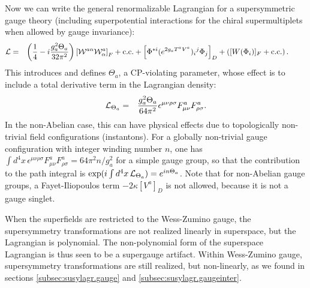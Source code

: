 \documentclass[12pt]{article}
\def\beq{\begin{eqnarray}}
\def\eeq{\end{eqnarray}}
\begin{document}
Now we can write the general renormalizable Lagrangian for a supersymmetric gauge theory (including superpotential interactions for the chiral supermultiplets when allowed by gauge invariance):
\beq
{\cal L} &=& \left ( \frac{1}{4}  - i \frac{g_a^2 \Theta_a}{32 \pi^2} 
\right ) 
\left [
{\cal W}^{a\alpha} {\cal W}^a_\alpha 
\right ]_F
+ {\rm c.c.}
+
\left [
\Phi^{*i} (e^{2g_a T^a V^a})_i{}^j \Phi_j \right]_D
+ 
\left ( [W(\Phi_i)]_F + {\rm c.c.} \right ) .
\phantom{xxxx}
\eeq
This introduces and defines 
$\Theta_a$, a CP-violating parameter, whose effect is to include a total derivative term
in the Lagrangian density:
\beq
{\cal L}_{\Theta_a} &=& 
\frac{g_a^2 \Theta_a}{64\pi^2} \epsilon^{\mu\nu\rho\sigma} F^a_{\mu\nu} F^a_{\rho\sigma}.
\eeq
In the non-Abelian case, this can have physical
effects due to topologically non-trivial field configurations (instantons). 
For a globally non-trivial
gauge configuration with integer winding number $n$, one has 
$\int d^4 x\, \epsilon^{\mu\nu\rho\sigma} F^a_{\mu\nu} F^a_{\rho\sigma} 
= 64 \pi^2 n/g_a^2$ for a simple gauge group,
so that the contribution to the path integral is 
$\exp({i\int d^4 x\,{\cal L}_{\scriptstyle \Theta_a}})
=e^{i n \Theta_a}$.
Note that for non-Abelian gauge groups, a Fayet-Iliopoulos term $-2\kappa [V^a]_D$ is not 
allowed, because it is not a gauge singlet.

When the superfields are restricted to the Wess-Zumino gauge, the supersymmetry transformations 
are not realized linearly in superspace, but the Lagrangian is polynomial. The 
non-polynomial form of the superspace Lagrangian is thus seen to be a supergauge artifact. 
Within Wess-Zumino gauge, supersymmetry transformations are still realized, but 
non-linearly, as we found in sections \ref{subsec:susylagr.gauge} and 
\ref{subsec:susylagr.gaugeinter}.
\end{document}
